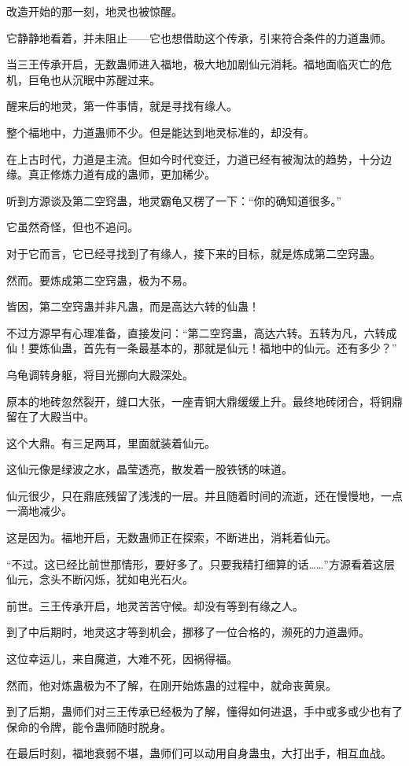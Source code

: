 \begin{this_body}
改造开始的那一刻，地灵也被惊醒。

它静静地看着，并未阻止——它也想借助这个传承，引来符合条件的力道蛊师。

当三王传承开启，无数蛊师进入福地，极大地加剧仙元消耗。福地面临灭亡的危机，巨龟也从沉眠中苏醒过来。

醒来后的地灵，第一件事情，就是寻找有缘人。

整个福地中，力道蛊师不少。但是能达到地灵标准的，却没有。

在上古时代，力道是主流。但如今时代变迁，力道已经有被淘汰的趋势，十分边缘。真正修炼力道有成的蛊师，更加稀少。

听到方源谈及第二空窍蛊，地灵霸龟又楞了一下：“你的确知道很多。”

它虽然奇怪，但也不追问。

对于它而言，它已经寻找到了有缘人，接下来的目标，就是炼成第二空窍蛊。

然而。要炼成第二空窍蛊，极为不易。

皆因，第二空窍蛊并非凡蛊，而是高达六转的仙蛊！

不过方源早有心理准备，直接发问：“第二空窍蛊，高达六转。五转为凡，六转成仙！要炼仙蛊，首先有一条最基本的，那就是仙元！福地中的仙元。还有多少？”

乌龟调转身躯，将目光挪向大殿深处。

原本的地砖忽然裂开，缝口大张，一座青铜大鼎缓缓上升。最终地砖闭合，将铜鼎留在了大殿当中。

这个大鼎。有三足两耳，里面就装着仙元。

这仙元像是绿波之水，晶莹透亮，散发着一股铁锈的味道。

仙元很少，只在鼎底残留了浅浅的一层。并且随着时间的流逝，还在慢慢地，一点一滴地减少。

这是因为。福地开启，无数蛊师正在探索，不断进出，消耗着仙元。

“不过。这已经比前世那情形，要好多了。只要我精打细算的话……”方源看着这层仙元，念头不断闪烁，犹如电光石火。

前世。三王传承开启，地灵苦苦守候。却没有等到有缘之人。

到了中后期时，地灵这才等到机会，挪移了一位合格的，濒死的力道蛊师。

这位幸运儿，来自魔道，大难不死，因祸得福。

然而，他对炼蛊极为不了解，在刚开始炼蛊的过程中，就命丧黄泉。

到了后期，蛊师们对三王传承已经极为了解，懂得如何进退，手中或多或少也有了保命的令牌，能令蛊师随时脱身。

在最后时刻，福地衰弱不堪，蛊师们可以动用自身蛊虫，大打出手，相互血战。


\end{this_body}
